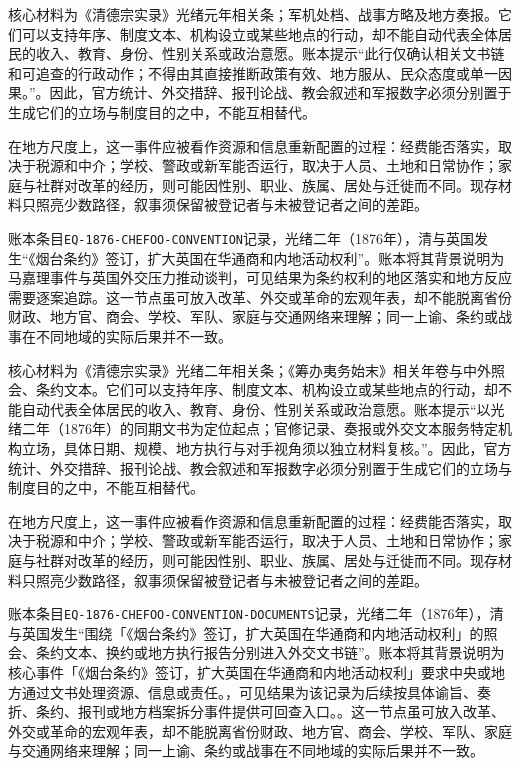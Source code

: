 核心材料为《清德宗实录》光绪元年相关条；军机处档、战事方略及地方奏报。它们可以支持年序、制度文本、机构设立或某些地点的行动，却不能自动代表全体居民的收入、教育、身份、性别关系或政治意愿。账本提示“此行仅确认相关文书链和可追查的行政动作；不得由其直接推断政策有效、地方服从、民众态度或单一因果。”。因此，官方统计、外交措辞、报刊论战、教会叙述和军报数字必须分别置于生成它们的立场与制度目的之中，不能互相替代。

在地方尺度上，这一事件应被看作资源和信息重新配置的过程：经费能否落实，取决于税源和中介；学校、警政或新军能否运行，取决于人员、土地和日常协作；家庭与社群对改革的经历，则可能因性别、职业、族属、居处与迁徙而不同。现存材料只照亮少数路径，叙事须保留被登记者与未被登记者之间的差距。

账本条目\texttt{EQ-1876-CHEFOO-CONVENTION}记录，光绪二年（1876年），清与英国发生“《烟台条约》签订，扩大英国在华通商和内地活动权利”。账本将其背景说明为马嘉理事件与英国外交压力推动谈判，可见结果为条约权利的地区落实和地方反应需要逐案追踪。这一节点虽可放入改革、外交或革命的宏观年表，却不能脱离省份财政、地方官、商会、学校、军队、家庭与交通网络来理解；同一上谕、条约或战事在不同地域的实际后果并不一致。

核心材料为《清德宗实录》光绪二年相关条；《筹办夷务始末》相关年卷与中外照会、条约文本。它们可以支持年序、制度文本、机构设立或某些地点的行动，却不能自动代表全体居民的收入、教育、身份、性别关系或政治意愿。账本提示“以光绪二年（1876年）的同期文书为定位起点；官修记录、奏报或外交文本服务特定机构立场，具体日期、规模、地方执行与对手视角须以独立材料复核。”。因此，官方统计、外交措辞、报刊论战、教会叙述和军报数字必须分别置于生成它们的立场与制度目的之中，不能互相替代。

在地方尺度上，这一事件应被看作资源和信息重新配置的过程：经费能否落实，取决于税源和中介；学校、警政或新军能否运行，取决于人员、土地和日常协作；家庭与社群对改革的经历，则可能因性别、职业、族属、居处与迁徙而不同。现存材料只照亮少数路径，叙事须保留被登记者与未被登记者之间的差距。

账本条目\texttt{EQ-1876-CHEFOO-CONVENTION-DOCUMENTS}记录，光绪二年（1876年），清与英国发生“围绕「《烟台条约》签订，扩大英国在华通商和内地活动权利」的照会、条约文本、换约或地方执行报告分别进入外交文书链”。账本将其背景说明为核心事件「《烟台条约》签订，扩大英国在华通商和内地活动权利」要求中央或地方通过文书处理资源、信息或责任。，可见结果为该记录为后续按具体谕旨、奏折、条约、报刊或地方档案拆分事件提供可回查入口。。这一节点虽可放入改革、外交或革命的宏观年表，却不能脱离省份财政、地方官、商会、学校、军队、家庭与交通网络来理解；同一上谕、条约或战事在不同地域的实际后果并不一致。

